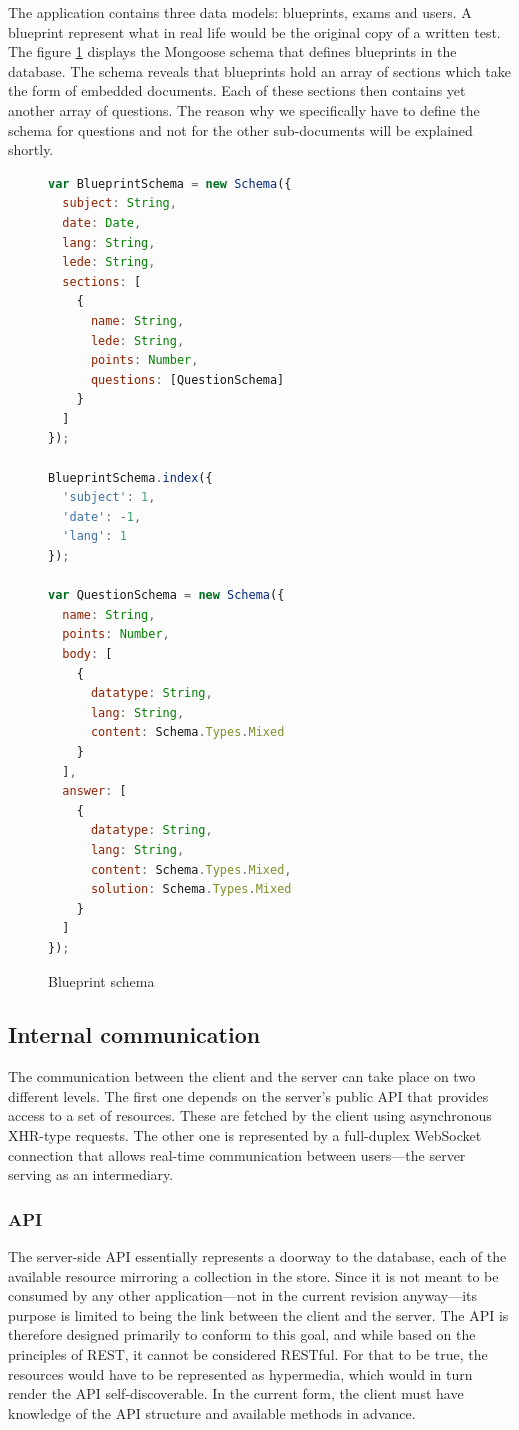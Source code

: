 \documentclass[thesis=M,english,hidelinks]{FITthesis}[2012/10/20]
\begin{document}
The application contains three data models: blueprints, exams and users. A blueprint represent what in real life would be the original copy of a written test. The figure \ref{fig:blueprint_schema} displays the Mongoose schema that defines blueprints in the database. The schema reveals that blueprints hold an array of sections which take the form of embedded documents. Each of these sections then contains yet another array of questions. The reason why we specifically have to define the schema for questions and not for the other sub-documents will be explained shortly.

\begin{figure}
  \begin{lstlisting}[language=JavaScript]
var BlueprintSchema = new Schema({
  subject: String,
  date: Date,
  lang: String,
  lede: String,
  sections: [
    {
      name: String,
      lede: String,
      points: Number,
      questions: [QuestionSchema]
    }
  ]
});

BlueprintSchema.index({
  'subject': 1,
  'date': -1,
  'lang': 1
});

var QuestionSchema = new Schema({
  name: String,
  points: Number,
  body: [
    {
      datatype: String,
      lang: String,
      content: Schema.Types.Mixed
    }
  ],
  answer: [
    {
      datatype: String,
      lang: String,
      content: Schema.Types.Mixed,
      solution: Schema.Types.Mixed
    }
  ]
});
  \end{lstlisting}
  \caption{Blueprint schema}
  \label{fig:blueprint_schema}
\end{figure}

    \subsection{Internal communication}

The communication between the client and the server can take place on two different levels. The first one depends on the server's public API that provides access to a set of resources. These are fetched by the client using asynchronous XHR-type requests. The other one is represented by a full-duplex WebSocket connection that allows real-time communication between users---the server serving as an intermediary.

      \subsubsection{API}

The server-side API essentially represents a doorway to the database, each of the available resource mirroring a collection in the store. Since it is not meant to be consumed by any other application---not in the current revision anyway---its purpose is limited to being the link between the client and the server. The API is therefore designed primarily to conform to this goal, and while based on the principles of REST, it cannot be considered RESTful. For that to be true, the resources would have to be represented as hypermedia, which would in turn render the API self-discoverable. In the current form, the client must have knowledge of the API structure and available methods in advance.
\end{document}

